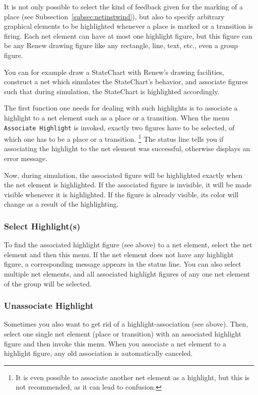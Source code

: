 It is not only possible to select the kind of feedback given for
the marking of a place (see Subsection~\ref{subsec:netinstwind}), but
also to specify arbitrary graphical elements to be highlighted
whenever a place is marked or a transition is firing.
Each net element can have at most one highlight figure, but this
figure can be any Renew drawing figure like any rectangle, line, text,
etc., even a group figure.

You can for example draw a StateChart with Renew's drawing
facilities, construct a net which simulates the StateChart's
behavior, and associate figures such that during simulation,
the StateChart is highlighted accordingly.

The first function one needs for dealing with such highlights is to
associate a highlight to a net element such as a place or a
transition.
When the menu \texttt{Associate Highlight} is invoked, exactly two
figures have to be selected, of which one has to be a place or a
transition.%
\footnote{It is even possible to associate another net element as a
highlight, but this is not recommended, as it can lead to confusion.
}
The status line tells you if associating the highlight to the net
element was successful, otherwise displays an error message.

Now, during simulation, the associated figure will be
highlighted exactly when the net element is highlighted.
If the associated figure is invisible, it will be made visible whenever
it is highlighted. If the figure is already visible, its color
will change as a result of the highlighting.

\subsubsection{Select Highlight(s)}

To find the associated highlight figure (see above) to a net element,
select the net element and then this menu.
If the net element does not have any highlight figure, a corresponding
message appears in the status line.
You can also select multiple net elements, and all associated
highlight figures of any one net element of the group will be selected.

\subsubsection{Unassociate Highlight}

Sometimes you also want to get rid of a highlight-association (see
above). Then, select one single net element (place or transition) with
an associated highlight figure and then invoke this menu.
When you associate a net element to a highlight figure, any old
association is automatically canceled.



